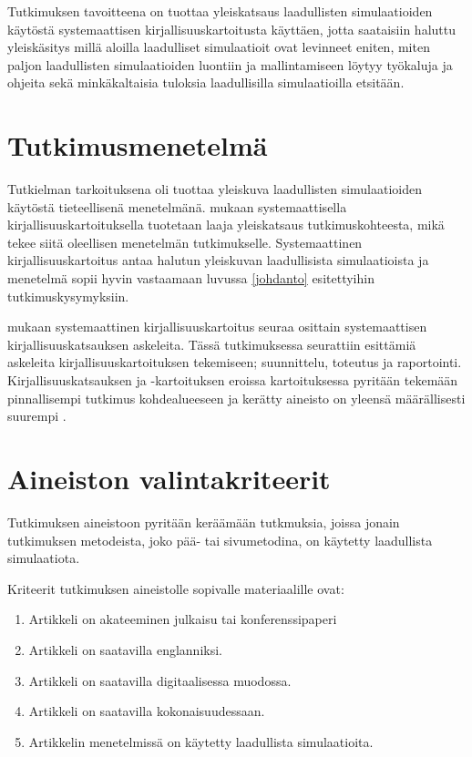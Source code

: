 \documentclass[utf8]{gradu3}
\begin{document}
Tutkimuksen tavoitteena on tuottaa yleiskatsaus laadullisten simulaatioiden käytöstä
systemaattisen kirjallisuuskartoitusta käyttäen, jotta saataisiin haluttu yleiskäsitys millä aloilla laadulliset simulaatioit ovat levinneet eniten, miten paljon laadullisten simulaatioiden luontiin ja mallintamiseen löytyy työkaluja ja ohjeita sekä minkäkaltaisia tuloksia laadullisilla simulaatioilla etsitään.

\section{Tutkimusmenetelmä} \label{tutkimusmenetelmä}
Tutkielman tarkoituksena oli tuottaa yleiskuva laadullisten simulaatioiden käytöstä
tieteellisenä menetelmänä.
\textcite{keele2007guidelines} mukaan systemaattisella kirjallisuuskartoituksella 
tuotetaan laaja yleiskatsaus tutkimuskohteesta,
mikä tekee siitä oleellisen menetelmän tutkimukselle. 
Systemaattinen kirjallisuuskartoitus antaa halutun yleiskuvan laadullisista simulaatioista ja menetelmä sopii hyvin vastaamaan luvussa \ref{johdanto} esitettyihin tutkimuskysymyksiin.

\textcite{keele2007guidelines} mukaan systemaattinen kirjallisuuskartoitus seuraa
osittain systemaattisen kirjallisuuskatsauksen askeleita.
Tässä tutkimuksessa seurattiin \textcite{keele2007guidelines} esittämiä askeleita kirjallisuuskartoituksen tekemiseen; suunnittelu, toteutus ja raportointi.
Kirjallisuuskatsauksen ja -kartoituksen eroissa kartoituksessa pyritään tekemään 
pinnallisempi tutkimus kohdealueeseen ja kerätty aineisto on 
yleensä määrällisesti suurempi \parencite{keele2007guidelines}.

\section{Aineiston valintakriteerit} \label{valintakriteerit}
Tutkimuksen aineistoon pyritään keräämään tutkmuksia, joissa jonain tutkimuksen metodeista, joko pää- tai sivumetodina, on käytetty laadullista simulaatiota.

Kriteerit tutkimuksen aineistolle sopivalle materiaalille ovat:
\begin{enumerate}
    \item Artikkeli on akateeminen julkaisu tai konferenssipaperi
    \item Artikkeli on saatavilla englanniksi.
    \item Artikkeli on saatavilla digitaalisessa muodossa.
    \item Artikkeli on saatavilla kokonaisuudessaan.
    \item Artikkelin menetelmissä on käytetty laadullista simulaatioita.
\end{enumerate}
\end{document}
